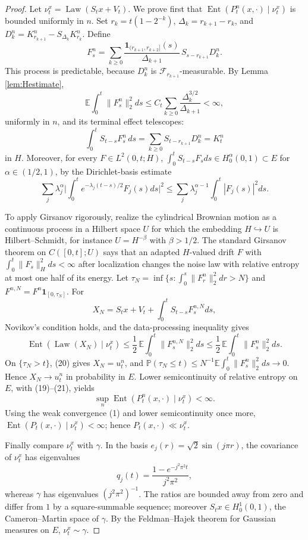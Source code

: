 \documentclass[12pt]{article}
\newcommand{\E}{\mathbb E}
\newcommand{\1}{\mathbf 1}
\newcommand{\Law}{\operatorname{Law}}
\newcommand{\calF}{\mathcal F}
\newcommand{\Ent}{\operatorname{Ent}}
\begin{document}
\begin{proof}
Let \(\nu_t^x=\Law(S_tx+V_t)\).  We prove first that
\(\Ent(P_t^n(x,\cdot)\mid\nu_t^x)\) is bounded uniformly in \(n\).  Set
\(r_k=t(1-2^{-k})\), \(\Delta_k=r_{k+1}-r_k\), and
\(D_k^n=K^n_{r_{k+1}}-S_{\Delta_k}K^n_{r_k}\).  Define
\[
 F_s^n=\sum_{k\ge0}\frac{\1_{(r_{k+1},r_{k+2}]}(s)}{\Delta_{k+1}}\,
        S_{s-r_{k+1}}D_k^n .                                \tag{18}
\]
This process is predictable, because \(D_k^n\) is \(\calF_{r_{k+1}}\)-measurable.
By Lemma \ref{lem:Hestimate},
\[
 \E\int_0^t\|F_s^n\|_2^2ds
 \le C_t\sum_{k\ge0}\frac{\Delta_k^{3/2}}{\Delta_{k+1}}<\infty, \tag{19}
\]
uniformly in \(n\), and its terminal effect telescopes:
\[
 \int_0^tS_{t-s}F_s^n\,ds
 =\sum_{k\ge0}S_{t-r_{k+1}}D_k^n=K_t^n                       \tag{20}
\]
in \(H\).  Moreover, for every \(F\in L^2(0,t;H)\),
\(\int_0^tS_{t-s}F_sds\in H^\alpha_0(0,1)\subset E\) for
\(\alpha\in(1/2,1)\), by the Dirichlet-basis estimate
\[
 \sum_j\lambda_j^\alpha\Big|\int_0^te^{-\lambda_j(t-s)/2}F_j(s)ds\Big|^2
 \le \sum_j\lambda_j^{\alpha-1}\int_0^t|F_j(s)|^2ds .
\]

To apply Girsanov rigorously, realize the cylindrical Brownian motion as a
continuous process in a Hilbert space \(U\) for which the embedding
\(H\hookrightarrow U\) is Hilbert--Schmidt, for instance \(U=H^{-\beta}\) with
\(\beta>1/2\).  The standard Girsanov theorem on
\(C([0,t];U)\) says that an adapted \(H\)-valued drift \(F\) with
\(\int_0^t\|F_s\|_H^2ds<\infty\) after localization changes the noise law with
relative entropy at most one half of its energy.  Let
\(\tau_N=\inf\{s:\int_0^s\|F_r^n\|_2^2dr>N\}\) and
\(F^{n,N}=F^n\1_{[0,\tau_N]}\).  For
\[
 X_N=S_tx+V_t+\int_0^tS_{t-s}F_s^{n,N}ds ,
\]
Novikov's condition holds, and the data-processing inequality gives
\[
 \Ent(\Law(X_N)\mid\nu_t^x)
 \le \frac12\,\E\int_0^t\|F_s^{n,N}\|_2^2ds
 \le \frac12\,\E\int_0^t\|F_s^n\|_2^2ds .                   \tag{21}
\]
On \(\{\tau_N>t\}\), (20) gives \(X_N=u_t^n\), and
\(\mathbb P(\tau_N\le t)\le N^{-1}\E\int_0^t\|F_s^n\|_2^2ds\to0\).  Hence
\(X_N\to u_t^n\) in probability in \(E\).  Lower semicontinuity of relative
entropy on \(E\), with (19)--(21), yields
\[
        \sup_n\Ent(P_t^n(x,\cdot)\mid\nu_t^x)<\infty .       \tag{22}
\]
Using the weak convergence (1) and lower semicontinuity once more,
\(\Ent(P_t(x,\cdot)\mid\nu_t^x)<\infty\); hence
\(P_t(x,\cdot)\ll\nu_t^x\).

Finally compare \(\nu_t^x\) with \(\gamma\).  In the basis
\(e_j(r)=\sqrt2\sin(j\pi r)\), the covariance of \(\nu_t^x\) has eigenvalues
\[
        q_j(t)=\frac{1-e^{-j^2\pi^2t}}{j^2\pi^2},
\]
whereas \(\gamma\) has eigenvalues \((j^2\pi^2)^{-1}\).  The ratios are bounded
away from zero and differ from \(1\) by a square-summable sequence; moreover
\(S_tx\in H^1_0(0,1)\), the Cameron--Martin space of \(\gamma\).  By the
Feldman--Hajek theorem for Gaussian measures on \(E\), \(\nu_t^x\sim\gamma\).
\end{proof}
\end{document}
